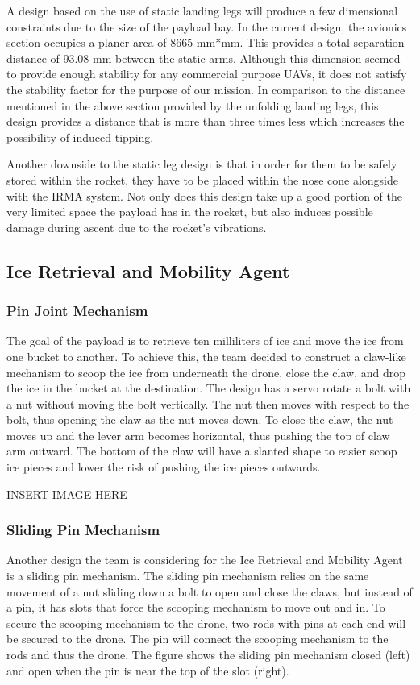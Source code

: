             A design based on the use of static landing legs will produce a few dimensional constraints due to the size of the payload bay. In the current design, the avionics section occupies a planer area of 8665 mm*mm. This provides a total separation distance of 93.08 mm between the static arms. Although this dimension seemed to provide enough stability for any commercial purpose UAVs, it does not satisfy the stability factor for the purpose of our mission. In comparison to the distance mentioned in the above section provided by the unfolding landing legs, this design provides a distance that is more than three times less which increases the possibility of induced tipping. 
            
            Another downside to the static leg design is that in order for them to be safely stored within the rocket, they have to be placed within the nose cone alongside with the IRMA system. Not only does this design take up a good portion of the very limited space the payload has in the rocket, but also induces possible damage during ascent due to the rocket’s vibrations.  
              

	\subsection{Ice Retrieval and Mobility Agent}
		\subsubsection{Pin Joint Mechanism}
			The goal of the payload is to retrieve ten milliliters of ice and move the ice from one bucket to another. To achieve this, the team decided to construct a claw-like mechanism to scoop the ice from underneath the drone, close the claw, and drop the ice in the bucket at the destination. The design has a servo rotate a bolt with a nut without moving the bolt vertically. The nut then moves with respect to the bolt, thus opening the claw as the nut moves down. To close the claw, the nut moves up and the lever arm becomes horizontal, thus pushing the top of claw arm outward. The bottom of the claw will have a slanted shape to easier scoop ice pieces and lower the risk of pushing the ice pieces outwards. 

			INSERT IMAGE HERE

		\subsubsection{Sliding Pin Mechanism}
			Another design the team is considering for the Ice Retrieval and Mobility Agent is a sliding pin mechanism. The sliding pin mechanism relies on the same movement of a nut sliding down a bolt to open and close the claws, but instead of a pin, it has slots that force the scooping mechanism to move out and in. To secure the scooping mechanism to the drone, two rods with pins at each end will be secured to the drone. The pin will connect the scooping mechanism to the rods and thus the drone. The figure shows the sliding pin mechanism closed (left) and open when the pin is near the top of the slot (right). 

